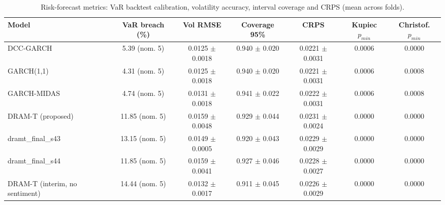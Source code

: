 \begin{table}
\caption{Risk-forecast metrics: VaR backtest calibration, volatility accuracy, interval coverage and CRPS (mean across folds).}
\label{tab:risk}
\begin{tabular}{lcccccc}
\toprule
Model & VaR breach (\%) & Vol RMSE & Coverage 95\% & CRPS & Kupiec $p_{min}$ & Christof. $p_{min}$ \\
\midrule
DCC-GARCH & 5.39 (nom. 5) & 0.0125 $\pm$ 0.0018 & 0.940 $\pm$ 0.020 & 0.0221 $\pm$ 0.0031 & 0.0006 & 0.0000 \\
GARCH(1,1) & 4.31 (nom. 5) & 0.0125 $\pm$ 0.0018 & 0.940 $\pm$ 0.020 & 0.0221 $\pm$ 0.0031 & 0.0006 & 0.0008 \\
GARCH-MIDAS & 4.74 (nom. 5) & 0.0131 $\pm$ 0.0018 & 0.941 $\pm$ 0.022 & 0.0222 $\pm$ 0.0031 & 0.0006 & 0.0008 \\
DRAM-T (proposed) & 11.85 (nom. 5) & 0.0159 $\pm$ 0.0048 & 0.929 $\pm$ 0.044 & 0.0231 $\pm$ 0.0024 & 0.0000 & 0.0000 \\
dramt_final_s43 & 13.15 (nom. 5) & 0.0149 $\pm$ 0.0005 & 0.920 $\pm$ 0.043 & 0.0229 $\pm$ 0.0029 & 0.0000 & 0.0000 \\
dramt_final_s44 & 11.85 (nom. 5) & 0.0159 $\pm$ 0.0041 & 0.927 $\pm$ 0.046 & 0.0228 $\pm$ 0.0027 & 0.0000 & 0.0000 \\
DRAM-T (interim, no sentiment) & 14.44 (nom. 5) & 0.0132 $\pm$ 0.0017 & 0.911 $\pm$ 0.045 & 0.0226 $\pm$ 0.0029 & 0.0000 & 0.0000 \\
\bottomrule
\end{tabular}
\end{table}
